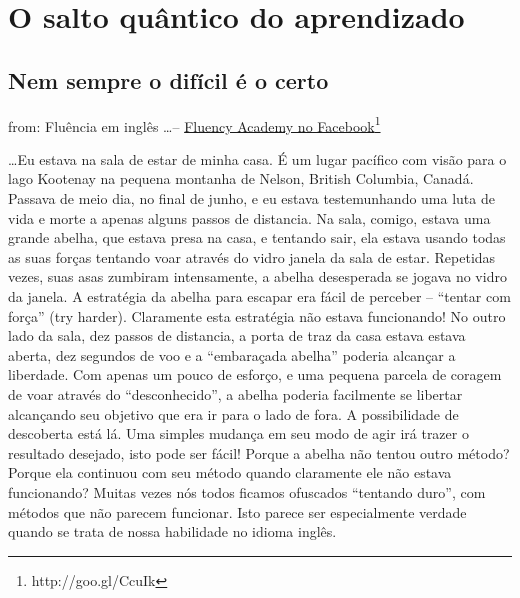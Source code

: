 
\chapter{O salto quântico do aprendizado}\label{salto-quantico}

\section{Nem sempre o difícil é o certo}\label{sec:abelha}

{\footnotesize from: Fluência em inglês \dots -- \href{http://goo.gl/CcuIk}{Fluency Academy no Facebook}\footnote{http://goo.gl/CcuIk}}

\dots Eu estava na sala de estar de minha casa. É um lugar pacífico com visão
para o lago Kootenay na pequena montanha de Nelson, British Columbia, Canadá.
Passava de meio dia, no final de junho, e eu estava testemunhando uma luta de
vida e morte a apenas alguns passos de distancia. Na sala, comigo, estava uma
grande abelha, que estava presa na casa, e tentando sair, ela estava usando
todas as suas forças tentando voar através do vidro janela da sala de estar.
Repetidas vezes, suas asas zumbiram intensamente, a abelha desesperada se
jogava no vidro da janela. A estratégia da abelha para escapar era fácil de
perceber -- ``tentar com força'' (try harder). Claramente esta estratégia não
estava funcionando! No outro lado da sala, dez passos de distancia, a porta de
traz da casa estava estava aberta, dez segundos de voo e a ``embaraçada
abelha'' poderia alcançar a liberdade. Com apenas um pouco de esforço, e uma
pequena parcela de coragem de voar através do ``desconhecido'', a abelha
poderia facilmente se libertar alcançando seu objetivo que era ir para o lado
de fora. A possibilidade de descoberta está lá. Uma simples mudança em seu modo
de agir irá trazer o resultado desejado, isto pode ser fácil! Porque a abelha
não tentou outro método? Porque ela continuou com seu método quando claramente
ele não estava funcionando? Muitas vezes nós todos ficamos ofuscados ``tentando
duro'', com métodos que não parecem funcionar. Isto parece ser especialmente
verdade quando se trata de nossa habilidade no idioma inglês.

